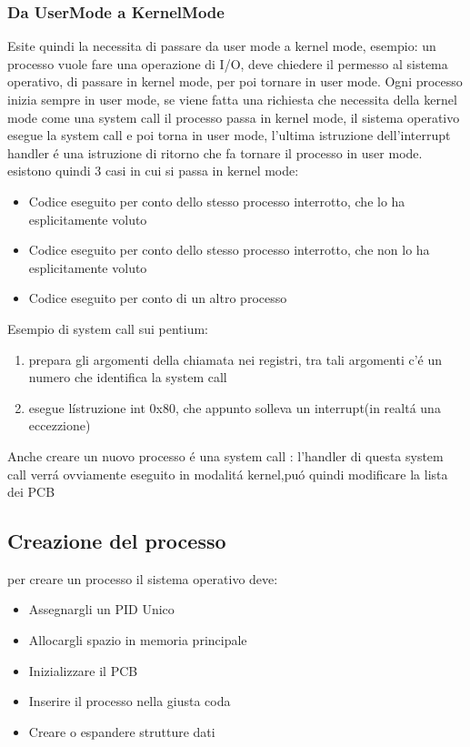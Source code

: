 \subsubsection{Da UserMode a KernelMode}
Esite quindi la necessita di passare da user mode a kernel mode, esempio: un processo vuole fare una operazione di I/O,
deve chiedere il permesso al sistema operativo, di passare in kernel mode, per poi tornare in user mode.
Ogni processo inizia sempre in user mode, se viene fatta una richiesta che necessita della kernel mode come una system call
il processo passa in kernel mode, il sistema operativo esegue la system call e poi torna in user mode, l'ultima istruzione
dell'interrupt handler é una istruzione di ritorno che fa tornare il processo in user mode.
esistono quindi 3 casi in cui si passa in kernel mode:
\begin{itemize}
    \item Codice eseguito per conto dello stesso processo interrotto, che lo ha esplicitamente voluto
    \item Codice eseguito per conto dello stesso processo interrotto, che non lo ha esplicitamente voluto
    \item Codice eseguito per conto di un altro processo
\end{itemize}
Esempio di system call sui pentium:
\begin{enumerate}
    \item prepara gli argomenti della chiamata nei registri, tra tali argomenti c'é un numero che identifica la system call
    \item esegue lístruzione int 0x80, che appunto solleva un interrupt(in realtá una eccezzione)
    \end{enumerate}
Anche creare un nuovo processo é una system call : l'handler di questa system call verrá ovviamente eseguito in modalitá kernel,puó quindi modificare la lista dei PCB
\subsection{Creazione del processo}
per creare un processo il sistema operativo deve:
\begin{itemize}
    \item Assegnargli un PID Unico
    \item Allocargli spazio in memoria principale
    \item Inizializzare il PCB
    \item Inserire il processo nella giusta coda
    \item Creare o espandere strutture dati
\end{itemize}
